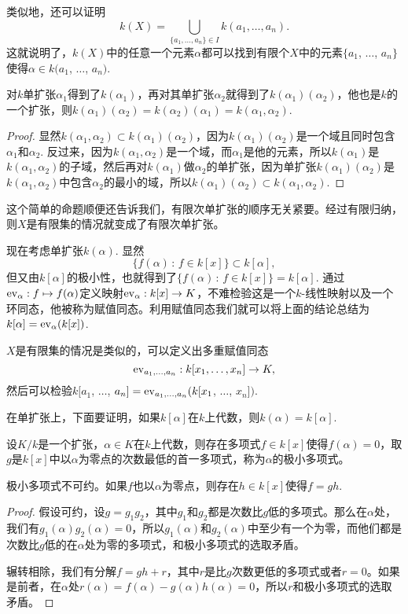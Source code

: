 类似地，还可以证明
\[
	k(X)=\bigcup_{\{a_1,\dots,a_n\}\in I} k(a_1,\dots,a_n).
\]
这就说明了，$k(X)$中的任意一个元素$\alpha$都可以找到有限个$X$中的元素$\{a_1$, $\dots$, $a_n\}$使得$\alpha\in k(a_1$, $\dots$, $a_n)$.

\begin{pro}
对$k$单扩张$\alpha_1$得到了$k(\alpha_1)$，再对其单扩张$\alpha_2$就得到了$k(\alpha_1)(\alpha_2)$，他也是$k$的一个扩张，则$k(\alpha_1)(\alpha_2)= k(\alpha_2)(\alpha_1)=k(\alpha_1,\alpha_2)$.
\end{pro}

\begin{proof} 显然$k(\alpha_1,\alpha_2)\subset k(\alpha_1)(\alpha_2)$，因为$k(\alpha_1)(\alpha_2)$是一个域且同时包含$\alpha_1$和$\alpha_2$. 反过来，因为$k(\alpha_1,\alpha_2)$是一个域，而$\alpha_1$是他的元素，所以$k(\alpha_1)$是$k(\alpha_1,\alpha_2)$的子域，然后再对$k(\alpha_1)$做$\alpha_2$的单扩张，因为单扩张$k(\alpha_1)(\alpha_2)$是$k(\alpha_1,\alpha_2)$中包含$\alpha_2$的最小的域，所以$k(\alpha_1)(\alpha_2)\subset k(\alpha_1,\alpha_2)$.\end{proof}

这个简单的命题顺便还告诉我们，有限次单扩张的顺序无关紧要。经过有限归纳，则$X$是有限集的情况就变成了有限次单扩张。

\para 现在考虑单扩张$k(\alpha)$. 显然
\[
	\{f(\alpha)\,:\, f\in k[x]\}\subset k[\alpha],
\]
但又由$k[\alpha]$的极小性，也就得到了$\{f(\alpha)\,:\, f\in k[x]\}=k[\alpha]$. 通过$\operatorname{ev}_{\alpha}:f\mapsto f(\alpha)$定义映射$\operatorname{ev}_{\alpha}:k[x]\to K$，不难检验这是一个$k$-线性映射以及一个环同态，他被称为赋值同态。利用赋值同态我们就可以将上面的结论总结为$k[\alpha]=\operatorname{ev}_{\alpha}(k[x])$.

$X$是有限集的情况是类似的，可以定义出多重赋值同态
\[
	\operatorname{ev}_{a_1,\dots,a_n}:k[x_1,\dots,x_n]\to K,
\]
然后可以检验$k[a_1$, $\dots$, $a_n]=\operatorname{ev}_{a_1,\dots,a_n}(k[x_1$, $\dots$, $x_n])$.

在单扩张上，下面要证明，如果$k[\alpha]$在$k$上代数，则$k(\alpha)=k[\alpha]$.

\para 设$K/k$是一个扩张，$\alpha\in K$在$k$上代数，则存在多项式$f\in k[x]$使得$f(\alpha)=0$，取$g$是$k[x]$中以$\alpha$为零点的次数最低的首一多项式，称为$\alpha$的极小多项式。

\begin{lem}
极小多项式不可约。如果$f$也以$\alpha$为零点，则存在$h\in k[x]$使得$f=gh$.
\end{lem}

\begin{proof} 
	假设可约，设$g=g_1g_2$，其中$g_1$和$g_2$都是次数比$g$低的多项式。那么在$\alpha$处，我们有$g_1(\alpha)g_2(\alpha)=0$，所以$g_1(\alpha)$和$g_2(\alpha)$中至少有一个为零，而他们都是次数比$g$低的在$\alpha$处为零的多项式，和极小多项式的选取矛盾。

	辗转相除，我们有分解$f=gh+r$，其中$r$是比$g$次数更低的多项式或者$r=0$。如果是前者，在$\alpha$处$r(\alpha)=f(\alpha)-g(\alpha)h(\alpha)=0$，所以$r$和极小多项式的选取矛盾。
\end{proof}

